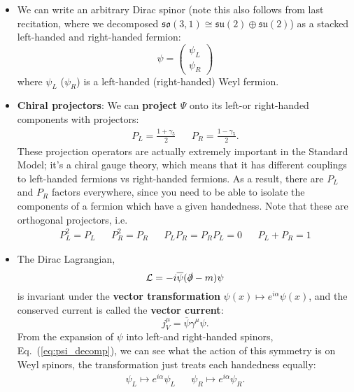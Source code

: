 \documentclass[12pt, oneside]{article}   	%
\theoremstyle{definition}
\begin{document}
\begin{itemize}
	\item We can write an arbitrary Dirac spinor (note this also follows from last recitation, where we decomposed $\mathfrak{so}(3, 1)\cong \mathfrak{su}(2)\oplus\mathfrak{su}(2)$) as a stacked left-handed and right-handed fermion:
\begin{equation}
	\psi = \begin{pmatrix} \psi_L \\ \psi_R \end{pmatrix} \label{eq:psi_decomp}
\end{equation}
	where $\psi_L$ ($\psi_R$) is a left-handed (right-handed) Weyl fermion. 
	
	\item \textbf{Chiral projectors}: We can \textbf{project} $\Psi$ onto its left-or right-handed components with projectors:
	\begin{align}
		P_L = \frac{1 + \gamma_5}{2} && P_R = \frac{1 - \gamma_5}{2}.
	\end{align}
	These projection operators are actually extremely important in the Standard Model; it's a chiral gauge theory, which means that it has different couplings to left-handed fermions vs right-handed fermions. As a result, there are $P_L$ and $P_R$ factors everywhere, since you need to be able to isolate the components of a fermion which have a given handedness. Note that these are orthogonal projectors, i.e.
	\begin{align}
	P_L^2 = P_L && P_R^2 = P_R && P_L P_R = P_R P_L = 0 && P_L + P_R = 1
	\end{align}
	
	\item The Dirac Lagrangian,
	\begin{equation}
		\mathcal L = -i \overline{\psi} (\slashed \partial - m)\psi \label{eq:dirac_lagrangian}
	\end{equation}
	is invariant under the \textbf{vector transformation} $\psi(x)\mapsto e^{i\alpha} \psi(x)$, and the conserved current is called the \textbf{vector current}:
	\begin{equation}
		j_V^\mu = \overline{\psi} \gamma^\mu \psi.
	\end{equation}
	From the expansion of $\psi$ into left-and right-handed spinors, Eq.~(\ref{eq:psi_decomp}), we can see what the action of this symmetry is on Weyl spinors, the transformation just treats each handedness equally:
	\begin{align}
		\psi_L\mapsto e^{i\alpha} \psi_L && \psi_R\mapsto e^{i\alpha} \psi_R.
	\end{align}
	

\end{itemize}
\end{document}
